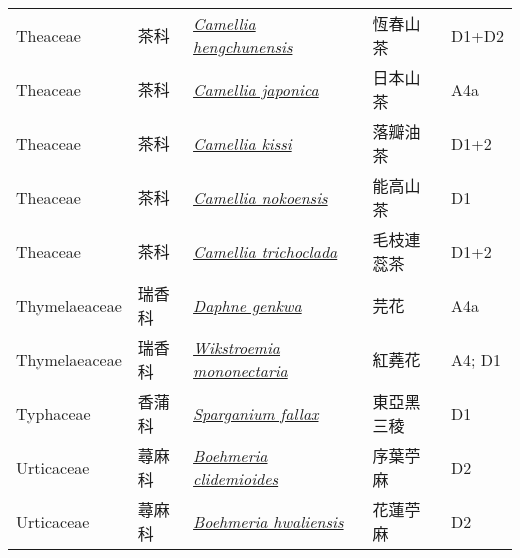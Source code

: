 {\begin{longtable}{p{2.5cm}p{2.5cm}p{4.5cm}p{2.5cm}p{3cm}}
    Theaceae & 茶科 & \href{http://www.theplantlist.org/tpl1.1/search?q=Camellia+hengchunensis}{\textit{Camellia hengchunensis} } & 恆春山茶 & D1+D2 \index{Camellia@\textit{Camellia}!hengchunensis@\textit{hengchunensis}}  \index{恆春山茶} \\
    Theaceae & 茶科 & \href{http://www.theplantlist.org/tpl1.1/search?q=Camellia+japonica}{\textit{Camellia japonica} } & 日本山茶 & A4a \index{Camellia@\textit{Camellia}!japonica@\textit{japonica}}  \index{日本山茶} \\
    Theaceae & 茶科 & \href{http://www.theplantlist.org/tpl1.1/search?q=Camellia+kissi}{\textit{Camellia kissi} } & 落瓣油茶 & D1+2 \index{Camellia@\textit{Camellia}!kissi@\textit{kissi}}  \index{落瓣油茶} \\
    Theaceae & 茶科 & \href{http://www.theplantlist.org/tpl1.1/search?q=Camellia+nokoensis}{\textit{Camellia nokoensis} } & 能高山茶 & D1 \index{Camellia@\textit{Camellia}!nokoensis@\textit{nokoensis}}  \index{能高山茶} \\
    Theaceae & 茶科 & \href{http://www.theplantlist.org/tpl1.1/search?q=Camellia+trichoclada}{\textit{Camellia trichoclada} } & 毛枝連蕊茶 & D1+2 \index{Camellia@\textit{Camellia}!trichoclada@\textit{trichoclada}}  \index{毛枝連蕊茶} \\
    Thymelaeaceae & 瑞香科 & \href{http://www.theplantlist.org/tpl1.1/search?q=Daphne+genkwa}{\textit{Daphne genkwa} } & 芫花 & A4a \index{Daphne@\textit{Daphne}!genkwa@\textit{genkwa}}  \index{芫花} \\
    Thymelaeaceae & 瑞香科 & \href{http://www.theplantlist.org/tpl1.1/search?q=Wikstroemia+mononectaria}{\textit{Wikstroemia mononectaria} } & 紅蕘花 & A4; D1 \index{Wikstroemia@\textit{Wikstroemia}!mononectaria@\textit{mononectaria}}  \index{紅蕘花} \\
    Typhaceae & 香蒲科 & \href{http://www.theplantlist.org/tpl1.1/search?q=Sparganium+fallax}{\textit{Sparganium fallax} } & 東亞黑三稜 & D1 \index{Sparganium@\textit{Sparganium}!fallax@\textit{fallax}}  \index{東亞黑三稜} \\
    Urticaceae & 蕁麻科 & \href{http://www.theplantlist.org/tpl1.1/search?q=Boehmeria+clidemioides}{\textit{Boehmeria clidemioides} } & 序葉苧麻 & D2 \index{Boehmeria@\textit{Boehmeria}!clidemioides@\textit{clidemioides}}  \index{序葉苧麻} \\
    Urticaceae & 蕁麻科 & \href{http://www.theplantlist.org/tpl1.1/search?q=Boehmeria+hwaliensis}{\textit{Boehmeria hwaliensis} } & 花蓮苧麻 & D2 \index{Boehmeria@\textit{Boehmeria}!hwaliensis@\textit{hwaliensis}}  \index{花蓮苧麻} \\

\end{longtable}}
